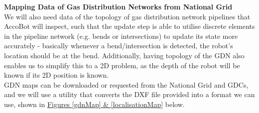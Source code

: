 \documentclass[11pt]{article}		%
\begin{document}
        \textbf{Mapping Data of Gas Distribution Networks from National Grid}
        \\We will also need data of the topology of gas distribution network pipelines that AccoBot will inspect, such that the update step is able to utilise discrete elements in the pipeline network (e.g. bends or intersections) to update its state more accurately - basically whenever a bend/intersection is detected, the robot's location should be at the bend. Additionally, having topology of the GDN also enables us to simplify this to a 2D problem, as the depth of the robot will be known if its 2D position is known.
        \\ \hspace*{3ex}GDN maps can be downloaded or requested from the National Grid and GDCs, and we will use a utility that converts the DXF file provided into a format we can use, shown in \hyperref[gdnMap]{Figures \ref*{gdnMap} \& \ref*{localisationMap}} below.
        
\end{document}
